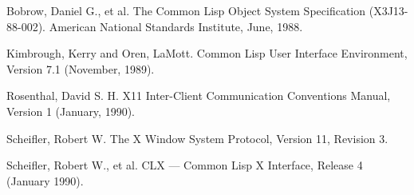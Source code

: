 \begin{thebibliography}{9}

 Bobrow, Daniel G., et al. The Common Lisp Object System
Specification (X3J13-88-002). American National Standards Institute, June,
1988.

 Kimbrough, Kerry and Oren, LaMott. Common Lisp User
Interface Environment, Version 7.1 (November, 1989).


 Rosenthal, David S. H. X11 Inter-Client Communication Conventions
Manual, Version 1 (January, 1990).

 Scheifler, Robert W. The X Window System Protocol, Version
11, Revision 3.

 Scheifler, Robert W., et al. CLX --- Common Lisp X Interface,
Release 4 (January 1990).

\end{thebibliography}



\begin{theindex}

\end{theindex}




